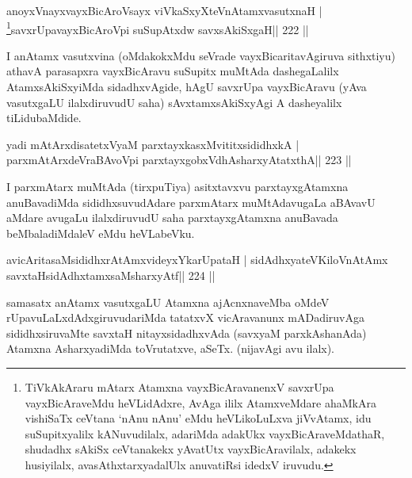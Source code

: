 
\begin{shl}
\footnotemark[\value{footnote}]anoyxVnayxvayxBicAroV\s sayx viVkaSxyXteV\s nAtamxvasutxnaH |
\footnote{TiVkAkAraru mAtarx Atamxna vayxBicAravanenxV savxrUpa vayxBicAraveMdu heVLidAdxre, AvAga ililx AtamxveMdare ahaMkAra vishiSaTx ceVtana `nAnu nAnu' eMdu heVLikoLuLxva jiVvAtamx, idu suSupitxyalilx kANuvudilalx, adariMda adakUkx vayxBicAraveMdathaR, shudadhx sAkiSx ceVtanakekx yAvatUtx vayxBicAravilalx, adakekx husiyilalx, avasAthxtarxyadalUlx anuvatiRsi idedxV iruvudu.}savxrUpavayxBicAroV\s pi suSupAtxdw savxsAkiSxgaH\hfill || 222 ||
\end{shl}

\begin{artha}
I anAtamx vasutxvina (oMdakokxMdu seVrade vayxBicaritavAgiruva sithxtiyu) athavA parasapxra vayxBicAravu suSupitx muMtAda dashegaLalilx AtamxsAkiSxyiMda sidadhxvAgide, hAgU savxrUpa vayxBicAravu (yAva vasutxgaLU ilalxdiruvudU saha) sAvxtamxsAkiSxyAgi A dasheyalilx tiLidubaMdide.
\end{artha}

\begin{shl}
yadi mAtArxdisatetxVyaM parxtayxkasxMvititxsididhxkA |
parxmAtArxdeVraBAvoV\s pi parxtayxgobxVdhAsharxyAtatxthA\hfill || 223 ||
\end{shl}

\begin{artha}
I parxmAtarx muMtAda (tirxpuTiya) asitxtavxvu parxtayxgAtamxna anuBavadiMda sididhxsuvudAdare parxmAtarx muMtAdavugaLa aBAvavU aMdare avugaLu ilalxdiruvudU saha parxtayxgAtamxna anuBavada beMbaladiMdaleV eMdu heVLabeVku.
\end{artha}


\begin{shl}
avicAritasaMsididhxrAtAmxvideyxYkarUpataH |
sidAdhxyateV\s KiloV\s nAtAmx savxtaHsidAdhxtamxsaMsharxyAtf\hfill || 224 ||
\end{shl}

\begin{artha}
samasatx anAtamx vasutxgaLU Atamxna ajAcnxnaveMba oMdeV rUpavuLaLxdAdxgiruvudariMda tatatxvX vicAravanunx mADadiruvAga sididhxsiruvaMte savxtaH nitayxsidadhxvAda (savxyaM parxkAshanAda) Atamxna AsharxyadiMda toVrutatxve, aSeTx. (nijavAgi avu ilalx).
\end{artha}

